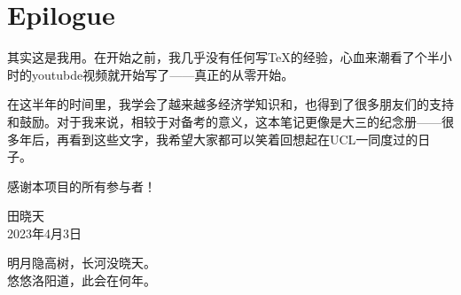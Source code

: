 \chapter*{Epilogue}

\fancyhead[R]{}
\fancyfoot[R]{}

其实这是我用。在开始之前，我几乎没有任何写TeX的经验，心血来潮看了个半小时的youtubde视频就开始写了——真正的从零开始。

在这半年的时间里，我学会了越来越多经济学知识和，也得到了很多朋友们的支持和鼓励。对于我来说，相较于对备考的意义，这本笔记更像是大三的纪念册——很多年后，再看到这些文字，我希望大家都可以笑着回想起在UCL一同度过的日子。

感谢本项目的所有参与者！

\bigskip

\begin{flushright}
田晓天\\
2023年4月3日
\end{flushright}

\bigskip

\begin{center}
明月隐高树，长河没晓天。\\
悠悠洛阳道，此会在何年。
\end{center}